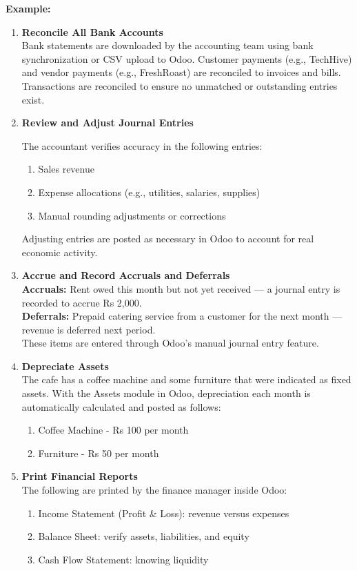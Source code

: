 \documentclass[11pt,a4paper]{article}
\begin{document}
\medskip
\noindent\textbf{Example:}
\begin{enumerate}
    \item \textbf{Reconcile All Bank Accounts} \\
    Bank statements are downloaded by the accounting team using bank synchronization or CSV upload to Odoo. Customer payments (e.g., TechHive) and vendor payments (e.g., FreshRoast) are reconciled to invoices and bills. Transactions are reconciled to ensure no unmatched or outstanding entries exist.

    \item \textbf{Review and Adjust Journal Entries}
    
    The accountant verifies accuracy in the following entries:
    \begin{enumerate}
        \item Sales revenue
        \item Expense allocations (e.g., utilities, salaries, supplies)
        \item Manual rounding adjustments or corrections
    \end{enumerate}
    Adjusting entries are posted as necessary in Odoo to account for real economic activity.

    \item \textbf{Accrue and Record Accruals and Deferrals} \\
    \textbf{Accruals:} Rent owed this month but not yet received — a journal entry is recorded to accrue Rs 2,000. \\
    \textbf{Deferrals:} Prepaid catering service from a customer for the next month — revenue is deferred next period. \\
    These items are entered through Odoo's manual journal entry feature.

    \item \textbf{Depreciate Assets} \\
    The cafe has a coffee machine and some furniture that were indicated as fixed assets. With the Assets module in Odoo, depreciation each month is automatically calculated and posted as follows:
    \begin{enumerate}
        \item Coffee Machine - Rs 100 per month
        \item Furniture - Rs 50 per month
    \end{enumerate}

    \item \textbf{Print Financial Reports} \\
    The following are printed by the finance manager inside Odoo:
    \begin{enumerate}
        \item Income Statement (Profit \& Loss): revenue versus expenses
        \item Balance Sheet: verify assets, liabilities, and equity
        \item Cash Flow Statement: knowing liquidity
    \end{enumerate}


\end{enumerate}
\end{document}
